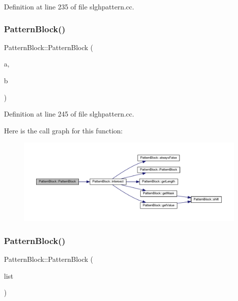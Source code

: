 Definition at line 235 of file slghpattern.\+cc.

\mbox{\label{class_pattern_block_a98cfbb5cd643eac16ef1e7eb69a974da}} 
\subsubsection{\texorpdfstring{PatternBlock()}{PatternBlock()}\hspace{0.1cm}{\footnotesize\ttfamily [3/4]}}
{\footnotesize\ttfamily Pattern\+Block\+::\+Pattern\+Block (\begin{DoxyParamCaption}\item[{const \mbox{\hyperlink{class_pattern_block}{Pattern\+Block}} $\ast$}]{a,  }\item[{const \mbox{\hyperlink{class_pattern_block}{Pattern\+Block}} $\ast$}]{b }\end{DoxyParamCaption})}



Definition at line 245 of file slghpattern.\+cc.

Here is the call graph for this function\+:
\nopagebreak
\begin{figure}[H]
\begin{center}
\leavevmode
\includegraphics[width=350pt]{class_pattern_block_a98cfbb5cd643eac16ef1e7eb69a974da_cgraph}
\end{center}
\end{figure}
\mbox{\label{class_pattern_block_a32b31cc7039db67430b9a439cceb6cb8}} 
\subsubsection{\texorpdfstring{PatternBlock()}{PatternBlock()}\hspace{0.1cm}{\footnotesize\ttfamily [4/4]}}
{\footnotesize\ttfamily Pattern\+Block\+::\+Pattern\+Block (\begin{DoxyParamCaption}\item[{vector$<$ \mbox{\hyperlink{class_pattern_block}{Pattern\+Block}} $\ast$ $>$ \&}]{list }\end{DoxyParamCaption})}



